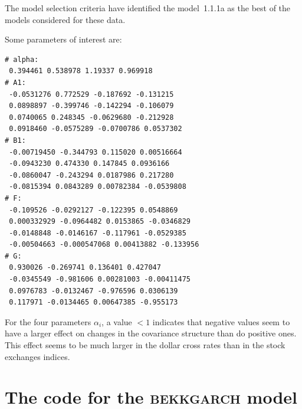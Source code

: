{The model selection criteria have identified the model~1.1.1a
as the best of the models considered for these data.

Some parameters of interest are:
\begin{lstlisting}
# alpha:
 0.394461 0.538978 1.19337 0.969918
# A1:
 -0.0531276 0.772529 -0.187692 -0.131215
 0.0898897 -0.399746 -0.142294 -0.106079
 0.0740065 0.248345 -0.0629680 -0.212928
 0.0918460 -0.0575289 -0.0700786 0.0537302
# B1:
 -0.00719450 -0.344793 0.115020 0.00516664
 -0.0943230 0.474330 0.147845 0.0936166
 -0.0860047 -0.243294 0.0187986 0.217280
 -0.0815394 0.0843289 0.00782384 -0.0539808
# F:
 -0.109526 -0.0292127 -0.122395 0.0548869
 0.000332929 -0.0964482 0.0153865 -0.0346829
 -0.0148848 -0.0146167 -0.117961 -0.0529385
 -0.00504663 -0.000547068 0.00413882 -0.133956
# G:
 0.930026 -0.269741 0.136401 0.427047
 -0.0345549 -0.981606 0.00281003 -0.00411475
 0.0976783 -0.0132467 -0.976596 0.0306139
 0.117971 -0.0134465 0.00647385 -0.955173
\end{lstlisting}
For the four parameters $\alpha_i$, a value $<1$ indicates
that negative values seem to have a larger effect on changes
in the covariance structure than do positive ones. This effect seems
to be much larger in the dollar cross rates than in the
stock exchanges indices.


\section{The code for the \textsc{bekkgarch} model}

}
